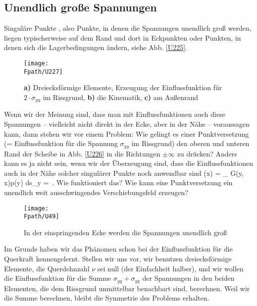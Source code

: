 \pagebreak
{\textcolor{sectionTitleBlue}{\section{Unendlich gro{\ss}e Spannungen}}}
Singul\"{a}re Punkte , also Punkte, in denen die Spannungen unendlich gro{\ss} werden, liegen typischerweise auf dem Rand und dort in Eckpunkten oder Punkten, in denen sich die Lagerbedingungen \"{a}ndern, siehe Abb. \ref{U225}.
\begin{figure}
\centering
\texttt{[image: \\Fpath/U227]}
\caption{\textbf{ a)} Dreiecksf\"{o}rmige Elemente, Erzeugung der Einflussfunktion f\"{u}r $2 \cdot \sigma_{yy}$ im Rissgrund, \textbf{ b)} die Kinematik, \textbf{ c)} am Au{\ss}enrand}
\label{U227}%
\end{figure}%

Wenn wir der Meinung sind, dass man mit Einflussfunktionen auch diese Spannungen -- vielleicht nicht direkt in der Ecke, aber in der N\"{a}he -- voraussagen kann, dann stehen wir vor einem Problem: Wie gelingt es einer Punktversetzung (= Einflussfunktion f\"{u}r die Spannung $\sigma_{yy}$ im Rissgrund)
den oberen und unteren Rand der Scheibe in Abb. \ref{U226} in die Richtungen $\pm \infty$ zu dr\"{u}cken?  Anders kann es ja nicht sein, wenn wir der \"{U}berzeugung sind, dass die Einflussfunktionen auch in der N\"{a}he solcher singul\"{a}rer Punkte noch anwendbar sind
\beq
\sigma(\vek x) = \int_{\Gamma} \textcolor{chapterTitleBlue}{\vek G(\vek y, \vek x)}\dotprod \vek  p(\vek y) ds_{\vek y} =  \infty\,.
\eeq
Wie funktioniert das? Wie kann eine Punktversetzung ein unendlich weit ausschwingendes Verschiebungsfeld erzeugen?
\begin{figure}
\centering
\texttt{[image: \\Fpath/U49]}
\caption{In der einspringenden Ecke werden die Spannungen unendlich gro{\ss}}
\label{U49}%
\end{figure}%

Im Grunde haben wir das Ph\"{a}nomen schon bei der Einflussfunktion f\"{u}r die Querkraft kennengelernt. Stellen wir uns vor, wir benutzen dreiecksf\"{o}rmige Elemente, die Querdehnzahl $\nu$ sei null (der Einfachheit halber), und wir wollen die Einflussfunktion f\"{u}r die Summe $\sigma_{yy} + \sigma_{yy}$ der Spannungen in den beiden Elementen, die dem Rissgrund unmittelbar benachbart sind, berechnen. Weil wir die Summe berechnen, bleibt die Symmetrie des Problems erhalten.

